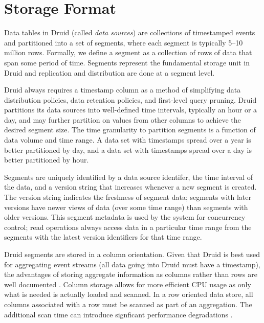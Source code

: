 \documentclass{sig-alternate-2013}
\begin{document}
\section{Storage Format}
\label{sec:storage-format}
Data tables in Druid (called \emph{data sources}) are collections of
timestamped events and partitioned into a set of segments, where each segment
is typically 5--10 million rows. Formally, we define a segment as a collection
of rows of data that span some period of time. Segments represent the
fundamental storage unit in Druid and replication and distribution are done at
a segment level.

Druid always requires a timestamp column as a method of simplifying data
distribution policies, data retention policies, and first-level query pruning.
Druid partitions its data sources into well-defined time intervals, typically
an hour or a day, and may further partition on values from other columns to
achieve the desired segment size. The time granularity
to partition segments is a function of data volume and time range. A data set
with timestamps spread over a year is better partitioned by day, and a data set
with timestamps spread over a day is better partitioned by hour.

Segments are uniquely identified by a data source identifer, the time interval
of the data, and a version string that increases whenever a new segment is
created. The version string indicates the freshness of segment data; segments
with later versions have newer views of data (over some time range) than
segments with older versions. This segment metadata is used by the system for
concurrency control; read operations always access data in a particular time
range from the segments with the latest version identifiers for that time
range.

Druid segments are stored in a column orientation. Given that Druid is best
used for aggregating event streams (all data going into Druid must have a
timestamp), the advantages of storing aggregate information as columns rather than
rows are well documented \cite{abadi2008column}. Column storage allows for more
efficient CPU usage as only what is needed is actually loaded and scanned. In a
row oriented data store, all columns associated with a row must be scanned as
part of an aggregation. The additional scan time can introduce signficant performance
degradations \cite{abadi2008column}.
\end{document}

